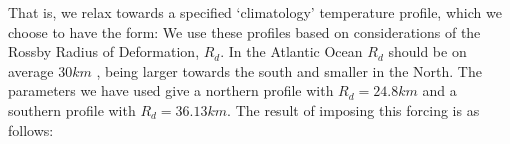 That is, we relax towards a specified `climatology' temperature profile, which we choose to have the form:
We use these profiles based on considerations of the Rossby Radius of Deformation, $R_{d}$. In the Atlantic Ocean $R_{d}$ should be on average $30km$ \cite{hallberg_2013}, being larger towards the south and smaller in the North. The parameters we have used give a northern profile with $R_{d} = 24.8km$ and a southern profile with $R_{d} = 36.13km$. The result of imposing this forcing is as follows:

